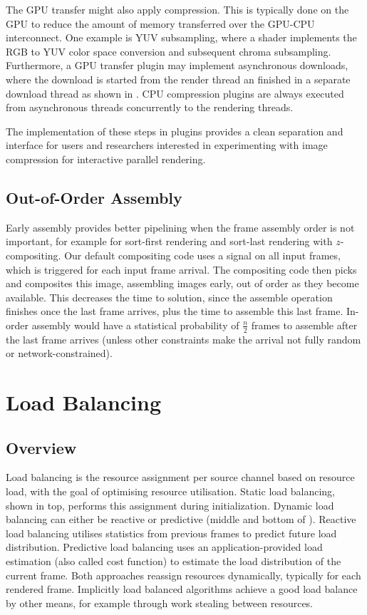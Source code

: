 The GPU transfer might also apply compression. This is typically done on the
GPU to reduce the amount of memory transferred over the GPU-CPU interconnect.
One example is YUV subsampling, where a shader implements the RGB to YUV color
space conversion and subsequent chroma subsampling. Furthermore, a GPU transfer
plugin may implement asynchronous downloads, where the download is started
from the render thread an finished in a separate download thread as shown in
. CPU compression plugins are always executed from asynchronous
threads concurrently to the rendering threads.

The implementation of these steps in plugins provides a clean separation and
interface for users and researchers interested in experimenting with image
compression for interactive parallel rendering.

\section{Out-of-Order Assembly}\label{sEarlyAss}

Early assembly provides better pipelining when the frame assembly order is not
important, for example for sort-first rendering and sort-last rendering with
$z$-compositing. Our default compositing code uses a signal on all input
frames, which is triggered for each input frame arrival. The compositing code
then picks and composites this image, assembling images early, out of order as
they become available. This decreases the time to solution, since the assemble
operation finishes once the last frame arrives, plus the time to assemble this
last frame. In-order assembly would have a statistical probability of
$\frac{n}{2}$ frames to assemble after the last frame arrives (unless other
constraints make the arrival not fully random or network-constrained).

\chapter{Load Balancing}\label{sLoadBalancing}

\section{Overview}

Load balancing is the resource assignment per source channel based on resource
load, with the goal of optimising resource utilisation. Static load balancing,
shown in  top, performs this assignment during
initialization. Dynamic load balancing can either be reactive or predictive
(middle and bottom of ). Reactive load balancing utilises
statistics from previous frames to predict future load distribution. Predictive
load balancing uses an application-provided load estimation (also called cost
function) to estimate the load distribution of the current frame. Both
approaches reassign resources dynamically, typically for each rendered frame.
Implicitly load balanced algorithms achieve a good load balance by other
means, for example through work stealing between resources.

